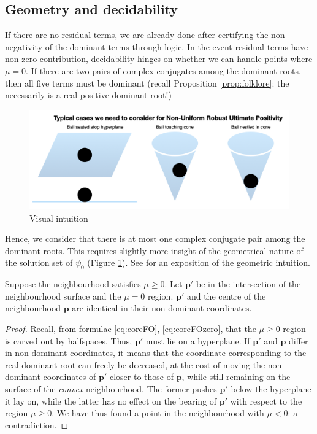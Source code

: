 \subsection{Geometry and decidability}
If there are no residual terms, we are already done after certifying the non-negativity of the dominant terms through logic. In the event residual terms have non-zero contribution, decidability hinges on whether we can handle points where $\mu = 0$. If there are two pairs of complex conjugates among the dominant roots, then all five terms must be dominant (recall Proposition \ref{prop:folklore}: the necessarily is a real positive dominant root!)

\begin{figure}[h]

\includegraphics[width=\textwidth]{picture1.png}
\caption{Visual intuition}
\label{fig:geometricpicture}
\end{figure}

Hence, we consider that there is at most one complex conjugate pair among the dominant roots. This requires slightly more insight of the geometrical nature of the solution set of $\psi_0$ (Figure \ref{fig:geometricpicture}). See \cite{originalstacs,originalarxiv} for an exposition of the geometric intuition. 

\begin{lemma}
\label{lem:residuesame}
Suppose the neighbourhood satisfies $\mu \ge 0$. Let $\mathbf{p'}$ be in the intersection of the neighbourhood surface and the $\mu = 0$ region. $\mathbf{p'}$ and the centre of the neighbourhood $\mathbf{p}$ are identical in their non-dominant coordinates.
\end{lemma}
\begin{proof}
 Recall, from formulae \ref{eq:coreFO}, \ref{eq:coreFOzero}, that the $\mu \ge 0$ region is carved out by halfspaces. Thus, $\mathbf{p'}$ must lie on a hyperplane. If $\mathbf{p'}$ and $\mathbf{p}$ differ in non-dominant coordinates, it means that the coordinate corresponding to the real dominant root can freely be decreased, at the cost of moving the non-dominant coordinates of $\mathbf{p'}$ closer to those of $\mathbf{p}$, while still remaining on the surface of the \textit{convex} neighbourhood. The former pushes $\mathbf{p'}$ below the hyperplane it lay on, while the latter has no effect on the bearing of $\mathbf{p'}$ with respect to the region $\mu \ge 0$. We have thus found a point in the neighbourhood with $\mu < 0$: a contradiction.
 \end{proof}

